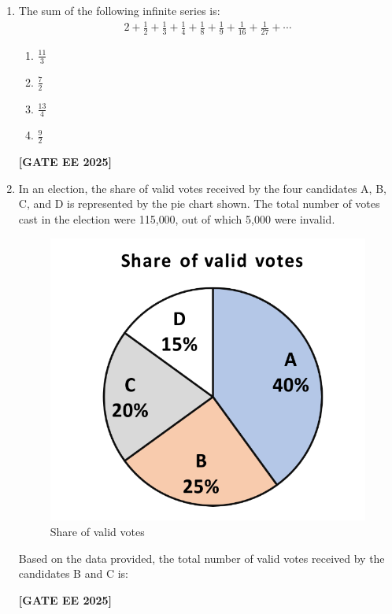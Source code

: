 \documentclass[journal]{IEEEtran}
\newcommand{\qfooter}{%
  \begin{flushright}\footnotesize\textbf{[GATE EE 2025]}\end{flushright}\vspace{1em}%
}
\begin{document}
\begin{enumerate}
\item The sum of the following infinite series is:
\begin{align}
2 + \frac{1}{2} + \frac{1}{3} + \frac{1}{4} + \frac{1}{8} + \frac{1}{9} + \frac{1}{16} + \frac{1}{27} + \cdots
\end{align}
\begin{multicols}{2}
\begin{enumerate}
\item $\frac{11}{3}$
\item $\frac{7}{2}$
\item $\frac{13}{4}$
\item $\frac{9}{2}$
\end{enumerate}
\qfooter
\end{multicols}

\item In an election, the share of valid votes received by the four candidates A, B, C, and D is represented by the pie chart shown.  
The total number of votes cast in the election were 115{,}000, out of which 5{,}000 were invalid.
\begin{figure}[h]
    \centering
    \includegraphics[width=0.45\columnwidth]{figs/q5.png}
    \caption{Share of valid votes}
\label{fig:q5} 
\end{figure}
Based on the data provided, the total number of valid votes received by the candidates B and C is:
\begin{enumerate}
\qfooter
\end{enumerate}


\end{enumerate}
\end{document}
